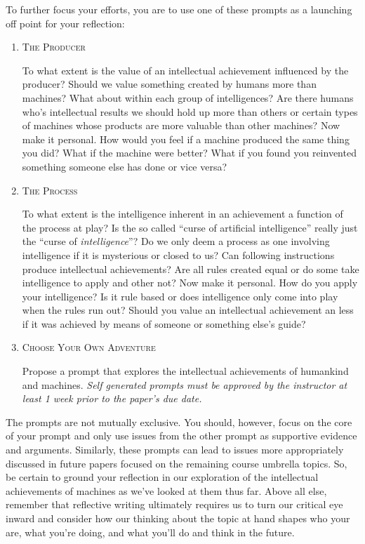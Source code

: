 \documentclass[]{tufte-handout}
\begin{document}
To further focus your efforts, you are to use one of these prompts as a launching off point for your reflection:
\begin{enumerate}
\item \textsc{The Producer} 

To what extent is the value of an intellectual achievement influenced by the producer?  Should we value something created by humans more than machines? What about within each group of intelligences? Are there humans who's intellectual results we should hold up more than others or certain types of machines whose products are more valuable than other machines?  Now make it personal. How would you feel if a machine produced the same thing you did? What if the machine were better? What if you found you reinvented something someone else has done or vice versa?  

\item \textsc{The Process} 

To what extent is the intelligence inherent in an achievement a function of the process at play?  Is the so called ``curse of artificial intelligence'' really just the ``curse of \textit{intelligence}''?  Do we only deem a process as one involving intelligence if it is mysterious or closed to us?  Can following instructions produce intellectual achievements? Are all rules created equal or do some take intelligence to apply and other not? Now make it personal. How do you apply your intelligence? Is it rule based or does intelligence only come into play when the rules run out? Should you value an intellectual achievement an less if it was achieved by means of someone or something else's guide? 

\item \textsc{Choose Your Own Adventure} 

Propose a prompt that explores the intellectual achievements of humankind and machines. \textit{Self generated prompts must be approved by the instructor at least 1 week prior to the paper's due date.}

\end{enumerate} 

The prompts are not mutually exclusive. You should, however, focus on the core of your prompt and only use issues from the other prompt as supportive evidence and arguments. Similarly, these prompts can lead to issues more appropriately discussed in future papers focused on the remaining course umbrella topics. So, be certain to ground your reflection in our exploration of the intellectual achievements of machines as we've looked at them thus far. Above all else, remember that reflective writing ultimately requires us to turn our critical eye inward and consider how our thinking about the topic at hand shapes who your are, what you're doing, and what you'll do and think in the future. 
\end{document}
